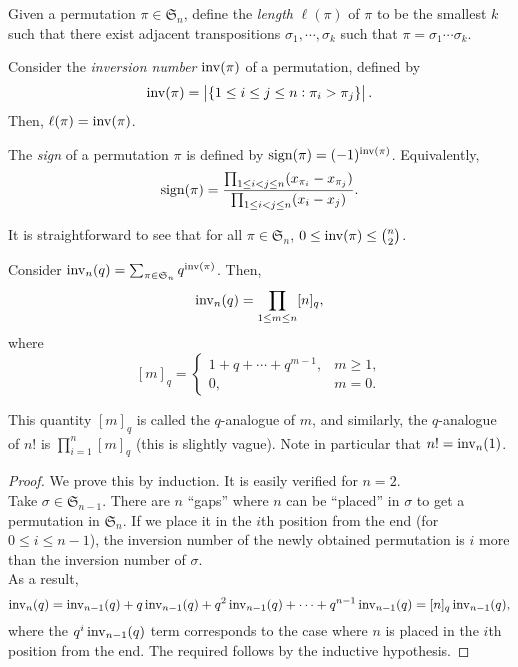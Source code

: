 	\begin{fdef}
		Given a permutation $\pi \in \mathfrak{S}_n$, define the \emph{length} $\ell(\pi)$ of $\pi$ to be the smallest $k$ such that there exist adjacent transpositions $\sigma_1,\cdots,\sigma_k$ such that $\pi = \sigma_1\cdots\sigma_k$.
	\end{fdef}

	\begin{fprop}
		Consider the \emph{inversion number} $\operatorname{inv}(\pi)$ of a permutation, defined by
		\[ \operatorname{inv}(\pi) = \left|\{ 1 \le i \le j \le n : \pi_i > \pi_j \}\right|. \]
		Then, $\ell(\pi) = \operatorname{inv}(\pi)$.
	\end{fprop}

	\begin{fdef}
		The \emph{sign} of a permutation $\pi$ is defined by $\operatorname{sign}(\pi) = (-1)^{\operatorname{inv}(\pi)}$. Equivalently,
		\[ \operatorname{sign}(\pi) = \frac{\prod_{1 \le i < j \le n} (x_{\pi_i} - x_{\pi_j})}{\prod_{1 \le i < j \le n} (x_i - x_j)}. \]
	\end{fdef}



	It is straightforward to see that for all $\pi \in \mathfrak{S}_n$, $0 \le \operatorname{inv}(\pi) \le \binom{n}{2}$.
	\begin{fprop}
		\label{prop: inv n}
		Consider $\operatorname{inv}_n(q) = \sum_{\pi \in \mathfrak{S}_n} q^{\operatorname{inv}(\pi)}$. Then,
		\[ \operatorname{inv}_n(q) = \prod_{1 \le m \le n} [n]_q, \]
		where
		\[ [m]_q = \begin{cases} 1 + q + \cdots + q^{m-1}, & m \ge 1, \\ 0, & m = 0. \end{cases} \]
	\end{fprop}
	This quantity $[m]_q$ is called the $q$-analogue of $m$, and similarly, the $q$-analogue of $n!$ is $\prod_{i=1}^n [m]_q$ (this is slightly vague).
	Note in particular that $n! = \operatorname{inv}_n(1)$.
	\begin{proof}
		We prove this by induction. It is easily verified for $n = 2$.\\
		Take $\sigma \in \mathfrak{S}_{n-1}$. There are $n$ ``gaps'' where $n$ can be ``placed'' in $\sigma$ to get a permutation in $\mathfrak{S}_n$. If we place it in the $i$th position from the end (for $0 \le i \le n-1$), the inversion number of the newly obtained permutation is $i$ more than the inversion number of $\sigma$.\\
		As a result,
		\[ \operatorname{inv}_n(q) = \operatorname{inv}_{n-1}(q) + q \operatorname{inv}_{n-1}(q) + q^2 \operatorname{inv}_{n-1}(q) + \cdots + q^{n-1} \operatorname{inv}_{n-1}(q) = [n]_q \operatorname{inv}_{n-1}(q), \]
		where the $q^i \operatorname{inv}_{n-1}(q)$ term corresponds to the case where $n$ is placed in the $i$th position from the end. The required follows by the inductive hypothesis.
	\end{proof}


